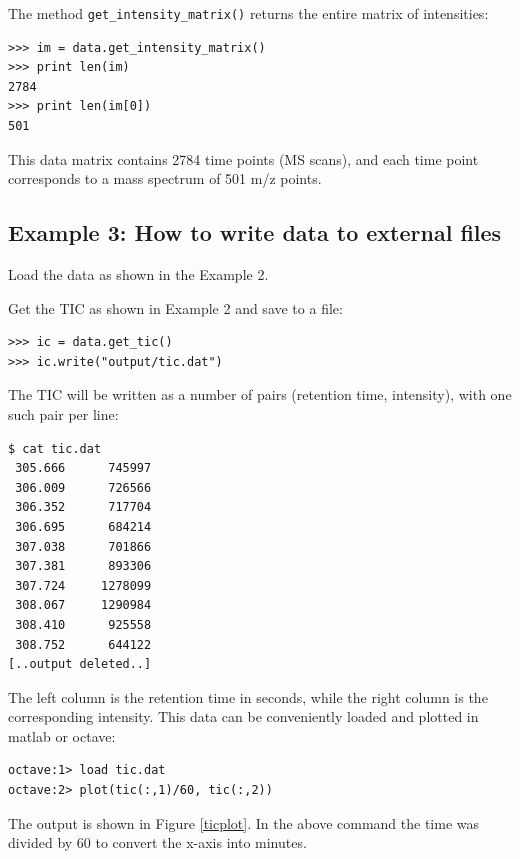 The method {\tt get\_intensity\_matrix()} returns the entire matrix of
intensities:

\begin{verbatim}
>>> im = data.get_intensity_matrix()
>>> print len(im)
2784
>>> print len(im[0])
501
\end{verbatim}

\noindent
This data matrix contains 2784 time points (MS scans), and each time point
corresponds to a mass spectrum of 501 m/z points.

\subsection{Example 3: How to write data to external files}

Load the data as shown in the Example 2.

Get the TIC as shown in Example 2 and save to a file:

\begin{verbatim}
>>> ic = data.get_tic()
>>> ic.write("output/tic.dat")
\end{verbatim}

\noindent
The TIC will be written as a number of pairs (retention time, intensity),
with one such pair per line:

\begin{verbatim}
$ cat tic.dat
 305.666      745997
 306.009      726566
 306.352      717704
 306.695      684214
 307.038      701866
 307.381      893306
 307.724     1278099
 308.067     1290984
 308.410      925558
 308.752      644122
[..output deleted..]
\end{verbatim}

\noindent
The left column is the retention time in seconds, while the right column
is the corresponding intensity. This data can be conveniently loaded and
plotted in matlab or octave:

\begin{verbatim}
octave:1> load tic.dat
octave:2> plot(tic(:,1)/60, tic(:,2))
\end{verbatim}

The output is shown in Figure \ref{ticplot}. In the above command the
time was divided by 60 to convert the x-axis into minutes.

